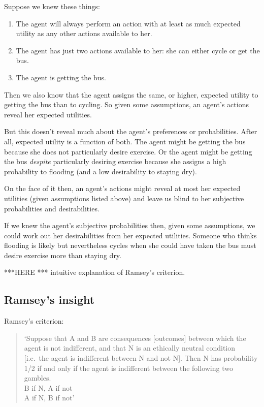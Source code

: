 \documentclass[12pt,\papersize]{extarticle}
\begin{document}
Suppose we knew these things:
\begin{enumerate}
\item The agent will always perform an action with at least as much expected utility as any other actions available to her.
\item The agent has just two actions available to her: she can either cycle or get the bus.
\item The agent is getting the bus.
\end{enumerate}
Then we also know that the agent assigns the same, or higher, expected utility to getting the bus than to cycling.
So given some assumptions, an agent's actions reveal her expected utilities.

But this doesn't reveal much about the agent's preferences or probabilities.  
After all, expected utility is a function of both.
The agent might be getting the bus because she does not particularly desire exercise.
Or the agent might be getting the bus \emph{despite} particularly desiring exercise because she assigns a high probability to flooding (and a low desirability to staying dry).

On the face of it then, an agent's actions might reveal at most her expected utilities (given assumptions listed above) and leave us blind to her subjective probabilities and desirabilities.

If we knew the agent's subjective probabilities then, given some assumptions, we could work out her desirabilities from her expected utilities.
Someone who thinks flooding is likely but nevertheless cycles when she could have taken the bus must desire exercise more than staying dry. 




***HERE
*** intuitive explanation of Ramsey's criterion.



\subsection{Ramsey's insight}
Ramsey's criterion:
\begin{quote}
`Suppose that A and B are consequences [outcomes] between which the agent is not indifferent, and that N is an ethically neutral condition [i.e.\ the agent is indifferent between N and not N]. 
Then N has probability 1/2 if and only if the agent is indifferent between the following two gambles.
	\\ \hspace*{10 mm} B if N, A if not 
	\\ \hspace*{10 mm} A if N, B if not'
	\citep[p.\ 47]{Jeffrey:1983oe}
\end{quote}
\end{document}
